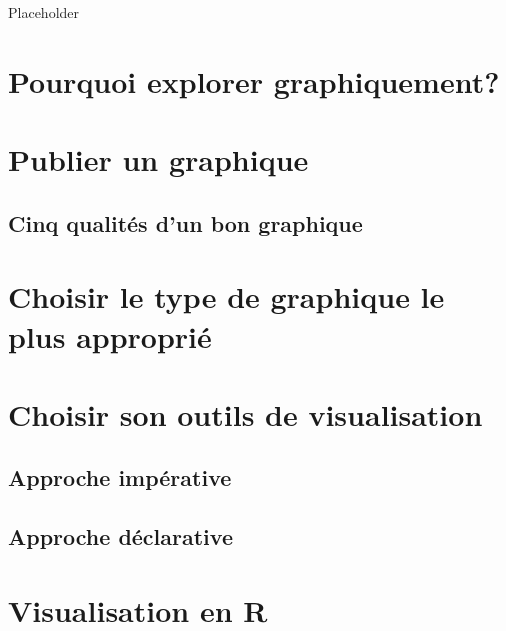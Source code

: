 \documentclass[]{book}
\begin{document}
Placeholder

\hypertarget{pourquoi-explorer-graphiquement}{%
\section{Pourquoi explorer
graphiquement?}\label{pourquoi-explorer-graphiquement}}

\hypertarget{publier-un-graphique}{%
\section{Publier un graphique}\label{publier-un-graphique}}

\hypertarget{cinq-qualituxe9s-dun-bon-graphique}{%
\subsection{Cinq qualités d'un bon
graphique}\label{cinq-qualituxe9s-dun-bon-graphique}}

\hypertarget{choisir-le-type-de-graphique-le-plus-appropriuxe9}{%
\section{Choisir le type de graphique le plus
approprié}\label{choisir-le-type-de-graphique-le-plus-appropriuxe9}}

\hypertarget{choisir-son-outils-de-visualisation}{%
\section{Choisir son outils de
visualisation}\label{choisir-son-outils-de-visualisation}}

\hypertarget{approche-impuxe9rative}{%
\subsection{Approche impérative}\label{approche-impuxe9rative}}

\hypertarget{approche-duxe9clarative}{%
\subsection{Approche déclarative}\label{approche-duxe9clarative}}

\hypertarget{visualisation-en-r}{%
\section{Visualisation en R}\label{visualisation-en-r}}
\end{document}
